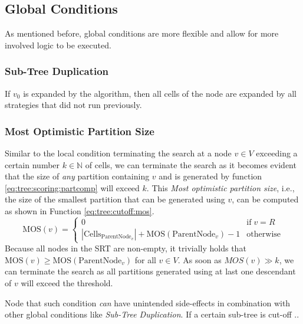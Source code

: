 		\subsection{Global Conditions}
			
			As mentioned before, global conditions are more flexible and allow for more involved logic to be executed.
			
			\subsubsection{Sub-Tree Duplication}
			
				If $v_0$ is expanded by the algorithm, then all cells of the node are expanded by all strategies that did not run previously.
				
			
			\subsubsection{Most Optimistic Partition Size}
			
				Similar to the local condition terminating the search at a node $v \in V$ exceeding a certain number $k \in \mathbb{N}$ of cells, we can terminate the search as it becomes evident that the size of \textit{any} partition containing $v$ and is generated by function \ref{eq:tree:scoring:partcomp} will exceed $k$.
				This \textit{Most optimistic partition size}, i.e., the size of the smallest partition that can be generated using $v$, can be computed as shown in Function \ref{eq:tree:cutoff:mos}.
				\begin{equation}
				\label{eq:tree:cutoff:mos}
					\mathrm{MOS}(v) = \begin{cases}
						0 & \text{if} \; v = R \\
						|\mathrm{Cells}_{\mathrm{ParentNode}_v}| + \mathrm{MOS}(\mathrm{ParentNode}_v) - 1 & \mathrm{otherwise}
					\end{cases}
				\end{equation}
				Because all nodes in the \ac{SRT} are non-empty, it trivially holds that $\mathrm{MOS}(v) \geq \mathrm{MOS}(\mathrm{ParentNode}_v)$ for all $v \in V$.
				As soon as $MOS(v) \gg k$, we can terminate the search as all partitions generated using at last one descendant of $v$ will exceed the threshold.
				
				Node that such condition \textit{can} have unintended side-effects in combination with other global conditions like \textit{Sub-Tree Duplication}.
				If a certain sub-tree is cut-off ..
				
